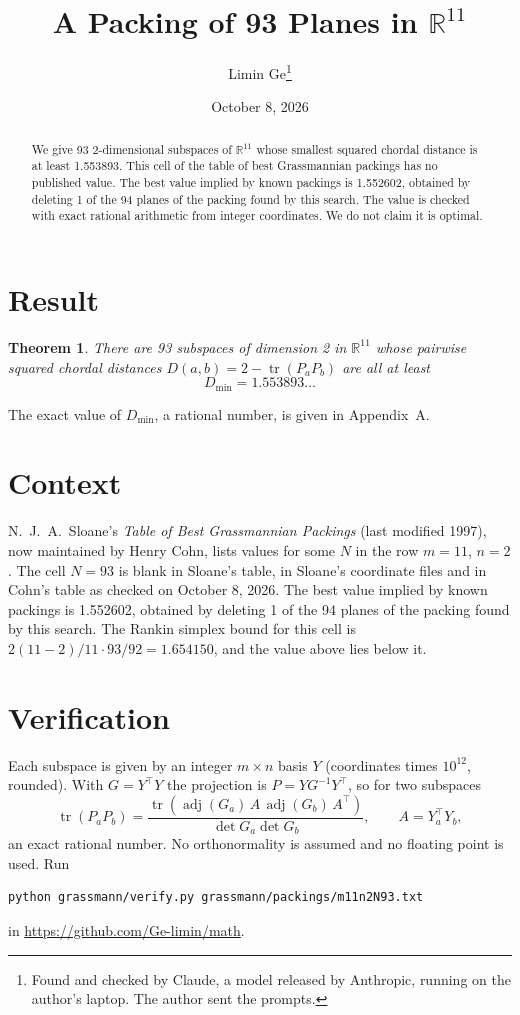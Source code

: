 \documentclass[11pt,a4paper]{article}
\title{A Packing of 93 Planes in $\mathbb{R}^{11}$}
\author{Limin Ge\thanks{Found and checked by Claude, a model released by Anthropic, running on the author's laptop. The author sent the prompts.}}
\date{October 8, 2026}
\newtheorem*{theorem}{Theorem}
\begin{document}
\maketitle
\begin{abstract}
We give 93 2-dimensional subspaces of $\mathbb{R}^{11}$ whose smallest squared chordal distance is at least 1.553893. This cell of the table of best Grassmannian packings has no published value. The best value implied by known packings is 1.552602, obtained by deleting 1 of the 94 planes of the packing found by this search. The value is checked with exact rational arithmetic from integer coordinates. We do not claim it is optimal.
\end{abstract}

\section{Result}
\begin{theorem}
There are 93 subspaces of dimension 2 in $\mathbb{R}^{11}$ whose pairwise squared chordal distances $D(a,b) = 2 - \operatorname{tr}(P_aP_b)$ are all at least
\[ D_{\min} = 1.553893\ldots \]
\end{theorem}
The exact value of $D_{\min}$, a rational number, is given in Appendix~A.


\section{Context}
N.~J.~A.~Sloane's \emph{Table of Best Grassmannian Packings} (last modified 1997), now maintained by Henry Cohn, lists values for some $N$ in the row $m=11$, $n=2$. The cell $N=93$ is blank in Sloane's table, in Sloane's coordinate files and in Cohn's table as checked on October 8, 2026. The best value implied by known packings is 1.552602, obtained by deleting 1 of the 94 planes of the packing found by this search. The Rankin simplex bound for this cell is $2(11-2)/11\cdot 93/92 = 1.654150$, and the value above lies below it.


\section{Verification}
Each subspace is given by an integer $m\times n$ basis $Y$ (coordinates times $10^{12}$, rounded). With $G=Y^\top Y$ the projection is $P=YG^{-1}Y^\top$, so for two subspaces
\[ \operatorname{tr}(P_aP_b)=\frac{\operatorname{tr}(\operatorname{adj}(G_a)\,A\,\operatorname{adj}(G_b)\,A^\top)}{\det G_a\det G_b},\qquad A=Y_a^\top Y_b, \]
an exact rational number. No orthonormality is assumed and no floating point is used. Run
\begin{verbatim}
python grassmann/verify.py grassmann/packings/m11n2N93.txt
\end{verbatim}
in \url{https://github.com/Ge-limin/math}.
\end{document}
